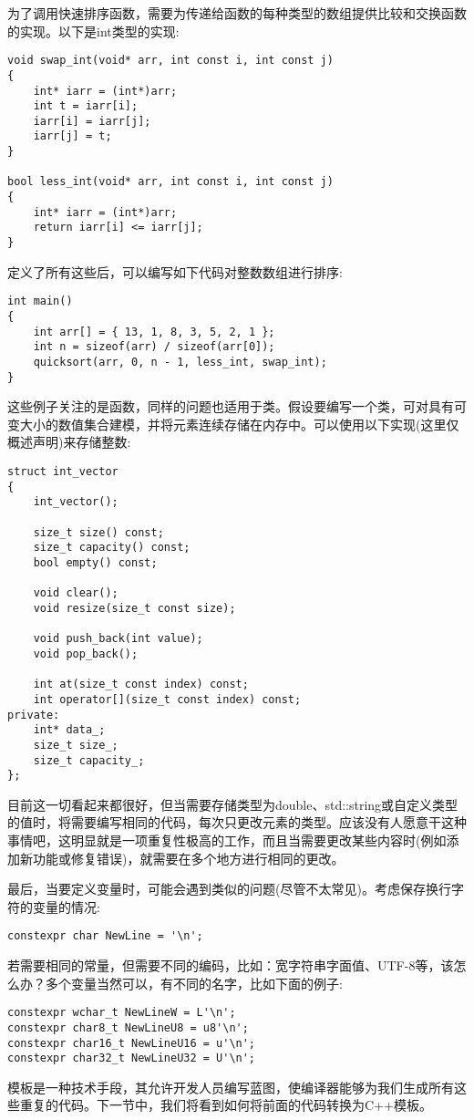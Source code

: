为了调用快速排序函数，需要为传递给函数的每种类型的数组提供比较和交换函数的实现。以下是int类型的实现:

\begin{lstlisting}[style=styleCXX]
void swap_int(void* arr, int const i, int const j)
{
	int* iarr = (int*)arr;
	int t = iarr[i];
	iarr[i] = iarr[j];
	iarr[j] = t;
}

bool less_int(void* arr, int const i, int const j)
{
	int* iarr = (int*)arr;
	return iarr[i] <= iarr[j];
}
\end{lstlisting}

定义了所有这些后，可以编写如下代码对整数数组进行排序:

\begin{lstlisting}[style=styleCXX]
int main()
{
	int arr[] = { 13, 1, 8, 3, 5, 2, 1 };
	int n = sizeof(arr) / sizeof(arr[0]);
	quicksort(arr, 0, n - 1, less_int, swap_int);
}
\end{lstlisting}

这些例子关注的是函数，同样的问题也适用于类。假设要编写一个类，可对具有可变大小的数值集合建模，并将元素连续存储在内存中。可以使用以下实现(这里仅概述声明)来存储整数:

\begin{lstlisting}[style=styleCXX]
struct int_vector
{
	int_vector();
	
	size_t size() const;
	size_t capacity() const;
	bool empty() const;
	
	void clear();
	void resize(size_t const size);
	
	void push_back(int value);
	void pop_back();
	
	int at(size_t const index) const;
	int operator[](size_t const index) const;
private:
	int* data_;
	size_t size_;
	size_t capacity_;
};
\end{lstlisting}

目前这一切看起来都很好，但当需要存储类型为double、std::string或自定义类型的值时，将需要编写相同的代码，每次只更改元素的类型。应该没有人愿意干这种事情吧，这明显就是一项重复性极高的工作，而且当需要更改某些内容时(例如添加新功能或修复错误)，就需要在多个地方进行相同的更改。

最后，当要定义变量时，可能会遇到类似的问题(尽管不太常见)。考虑保存换行字符的变量的情况:

\begin{lstlisting}[style=styleCXX]
constexpr char NewLine = '\n';
\end{lstlisting}

若需要相同的常量，但需要不同的编码，比如：宽字符串字面值、UTF-8等，该怎么办？多个变量当然可以，有不同的名字，比如下面的例子:

\begin{lstlisting}[style=styleCXX]
constexpr wchar_t NewLineW = L'\n';
constexpr char8_t NewLineU8 = u8'\n';
constexpr char16_t NewLineU16 = u'\n';
constexpr char32_t NewLineU32 = U'\n';
\end{lstlisting}

模板是一种技术手段，其允许开发人员编写蓝图，使编译器能够为我们生成所有这些重复的代码。下一节中，我们将看到如何将前面的代码转换为C++模板。






